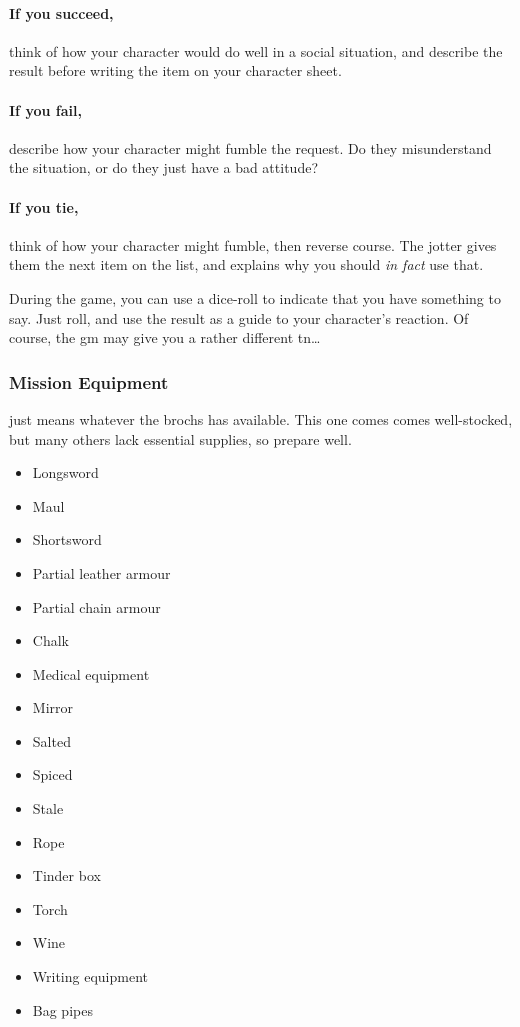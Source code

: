 \begin{multicols}{2}
\paragraph{If you succeed,}
think of how your character would do well in a social situation, and describe the result before writing the item on your character sheet.

\paragraph{If you fail,}
describe how your character might fumble the request.
Do they misunderstand the situation, or do they just have a bad attitude?

\paragraph{If you tie,}
think of how your character might fumble, then reverse course.
The jotter gives them the next item on the list, and explains why you should \emph{in fact} use that.

During the game, you can use a dice-roll to indicate that you have something to say.
Just roll, and use the result as a guide to your character's reaction.%
Of course, the \gls{gm} may give you a rather different \gls{tn}\ldots

\subsubsection{Mission Equipment}
\label{start_equipment}
just means whatever the \glspl{broch} has available.
This one comes comes well-stocked, but many others lack essential supplies, so prepare well.

\begin{multicols}{2}
\begin{itemize}
\raggedright
  \item
  Longsword
  \item
  Maul
  \item
  Shortsword
  \item
  Partial leather armour
  \item
  Partial chain armour
  \item
  Chalk
  \item
  Medical equipment
  \item
  Mirror
  \item
  Salted \rations
  \item
  Spiced \rations
  \item
  Stale \rations
  \item
  Rope
  \item
  Tinder box
  \item
  Torch
  \item
  Wine
  \item
  Writing equipment
  \item
  Bag pipes
\end{itemize}


\end{multicols}
\end{multicols}
